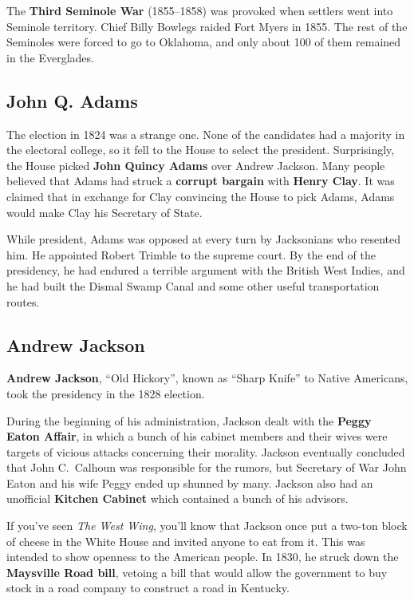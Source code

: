 The \textbf{Third Seminole War} (1855--1858) was provoked when settlers went into Seminole territory.
Chief Billy Bowlegs raided Fort Myers in 1855.
The rest of the Seminoles were forced to go to Oklahoma,
and only about 100 of them remained in the Everglades.

\subsection*{John Q. Adams}

The election in 1824 was a strange one.
None of the candidates had a majority in the electoral college,
so it fell to the House to select the president.
Surprisingly, the House picked \textbf{John Quincy Adams} over Andrew Jackson.
Many people believed that Adams had struck a \textbf{corrupt bargain} with \textbf{Henry Clay}.
It was claimed that in exchange for Clay convincing the House to pick Adams,
Adams would make Clay his Secretary of State.

While president, Adams was opposed at every turn by Jacksonians who resented him.
He appointed Robert Trimble to the supreme court.
By the end of the presidency, he had endured a terrible argument with the British West Indies,
and he had built the Dismal Swamp Canal and some other useful transportation routes.

\subsection*{Andrew Jackson}

\textbf{Andrew Jackson}, ``Old Hickory'', known as ``Sharp Knife'' to Native Americans,
took the presidency in the 1828 election.

During the beginning of his administration, Jackson dealt with the \textbf{Peggy Eaton Affair},
in which a bunch of his cabinet members
and their wives were targets of vicious attacks concerning their morality.
Jackson eventually concluded that John C.\ Calhoun was responsible for the rumors,
but Secretary of War John Eaton and his wife Peggy ended up shunned by many.
Jackson also had an unofficial \textbf{Kitchen Cabinet} which contained a bunch of his advisors.

If you've seen \textit{The West Wing},
you'll know that Jackson once put a two-ton block of cheese
in the White House and invited anyone to eat from it.
This was intended to show openness to the American people.
In 1830, he struck down the \textbf{Maysville Road bill},
vetoing a bill that would allow the government to buy stock in a road company
to construct a road in Kentucky.


